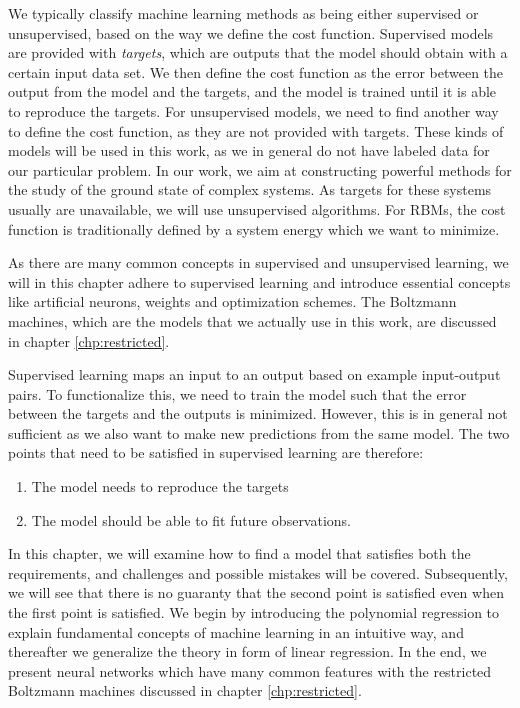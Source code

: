 We typically classify machine learning methods as being either supervised or unsupervised, based on the way we define the cost function. Supervised models are provided with \textit{targets}, which are outputs that the model should obtain with a certain input data set. We then define the cost function as the error between the output from the model and the targets, and the model is trained until it is able to reproduce the targets. For unsupervised models, we need to find another way to define the cost function, as they are not provided with targets. These kinds of models will be used in this work, as we in general do not have labeled data for our particular problem. In our work, we aim at constructing powerful methods for the study of the ground state of complex systems. As targets for these systems usually are unavailable, we will use unsupervised algorithms. For RBMs, the cost function is traditionally defined by a system energy which we want to minimize. 

As there are many common concepts in supervised and unsupervised learning, we will in this chapter adhere to supervised learning and introduce essential concepts like artificial neurons, weights and optimization schemes. The Boltzmann machines, which are the models that we actually use in this work, are discussed in chapter \ref{chp:restricted}.

Supervised learning maps an input to an output based on example input-output pairs. To functionalize this, we need to train the model such that the error between the targets and the outputs is minimized. However, this is in general not sufficient as we also want to make new predictions from the same model. The two points that need to be satisfied in supervised learning are therefore:
\begin{enumerate}
	\item The model needs to reproduce the targets
	\item The model should be able to fit future observations.
\end{enumerate}
In this chapter, we will examine how to find a model that satisfies both the requirements, and challenges and possible mistakes will be covered. Subsequently, we will see that there is no guaranty that the second point is satisfied even when the first point is satisfied. We begin by introducing the polynomial regression to explain fundamental concepts of machine learning in an intuitive way, and thereafter we generalize the theory in form of linear regression. In the end, we present neural networks which have many common features with the restricted Boltzmann machines discussed in chapter \ref{chp:restricted}. 

